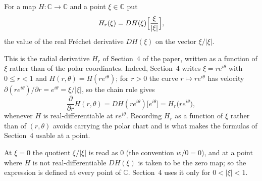 \begin{definition}
For a map $H\colon\mathbb{C}\to\mathbb{C}$ and a point $\xi\in\mathbb{C}$ put
\[
  H_r(\xi)=DH(\xi)\Bigl[\frac{\xi}{|\xi|}\Bigr],
\]
the value of the real Fr\'echet derivative $DH(\xi)$ on the vector
$\xi/|\xi|$.

This is the radial derivative $H_r$ of Section~4 of the paper, written as a
function of $\xi$ rather than of the polar coordinates.  Indeed, Section~4
writes $\xi=re^{i\theta}$ with $0\le r<1$ and $H(r,\theta)=H(re^{i\theta})$;
for $r>0$ the curve $r\mapsto re^{i\theta}$ has velocity
$\partial(re^{i\theta})/\partial r=e^{i\theta}=\xi/|\xi|$, so the chain rule
gives
\[
  \frac{\partial}{\partial r}H(r,\theta)=DH(re^{i\theta})\bigl[e^{i\theta}\bigr]
  =H_r\bigl(re^{i\theta}\bigr),
\]
whenever $H$ is real-differentiable at $re^{i\theta}$.  Recording $H_r$ as a
function of $\xi$ rather than of $(r,\theta)$ avoids carrying the polar chart
and is what makes the formulas of Section~4 usable at a point.

At $\xi=0$ the quotient $\xi/|\xi|$ is read as $0$ (the convention $w/0=0$),
and at a point where $H$ is not real-differentiable $DH(\xi)$ is taken to be
the zero map; so the expression is defined at every point of $\mathbb{C}$.  Section~4 uses it only for $0<|\xi|<1$.
\end{definition}

